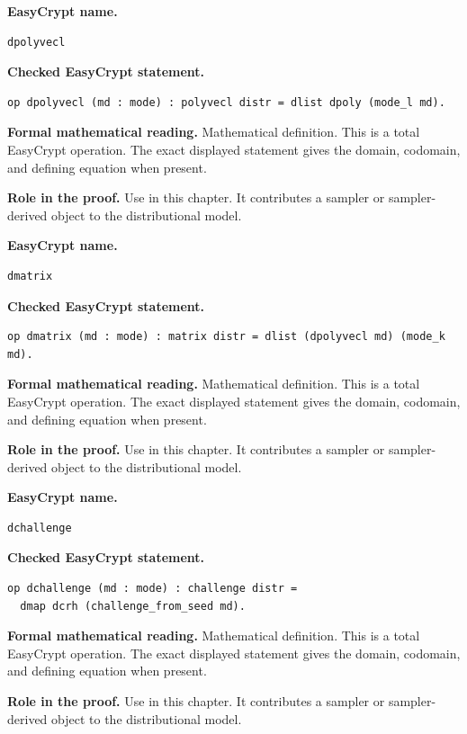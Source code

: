 \begin{formaldefinition}
\noindent\textbf{EasyCrypt name.}
\begin{lstlisting}[language=EasyCrypt,basicstyle=\ttfamily\scriptsize]
dpolyvecl
\end{lstlisting}
\noindent\textbf{Checked EasyCrypt statement.}
\begin{lstlisting}[language=EasyCrypt,basicstyle=\ttfamily\scriptsize]
op dpolyvecl (md : mode) : polyvecl distr = dlist dpoly (mode_l md).
\end{lstlisting}
\noindent\textbf{Formal mathematical reading.}
Mathematical definition. This is a total EasyCrypt operation.  The exact displayed statement gives the domain, codomain, and defining equation when present.

\noindent\textbf{Role in the proof.}
Use in this chapter. It contributes a sampler or sampler-derived object to the distributional model.

\end{formaldefinition}

\begin{formaldefinition}
\noindent\textbf{EasyCrypt name.}
\begin{lstlisting}[language=EasyCrypt,basicstyle=\ttfamily\scriptsize]
dmatrix
\end{lstlisting}
\noindent\textbf{Checked EasyCrypt statement.}
\begin{lstlisting}[language=EasyCrypt,basicstyle=\ttfamily\scriptsize]
op dmatrix (md : mode) : matrix distr = dlist (dpolyvecl md) (mode_k md).
\end{lstlisting}
\noindent\textbf{Formal mathematical reading.}
Mathematical definition. This is a total EasyCrypt operation.  The exact displayed statement gives the domain, codomain, and defining equation when present.

\noindent\textbf{Role in the proof.}
Use in this chapter. It contributes a sampler or sampler-derived object to the distributional model.

\end{formaldefinition}

\begin{formaldefinition}
\noindent\textbf{EasyCrypt name.}
\begin{lstlisting}[language=EasyCrypt,basicstyle=\ttfamily\scriptsize]
dchallenge
\end{lstlisting}
\noindent\textbf{Checked EasyCrypt statement.}
\begin{lstlisting}[language=EasyCrypt,basicstyle=\ttfamily\scriptsize]
op dchallenge (md : mode) : challenge distr =
  dmap dcrh (challenge_from_seed md).
\end{lstlisting}
\noindent\textbf{Formal mathematical reading.}
Mathematical definition. This is a total EasyCrypt operation.  The exact displayed statement gives the domain, codomain, and defining equation when present.

\noindent\textbf{Role in the proof.}
Use in this chapter. It contributes a sampler or sampler-derived object to the distributional model.

\end{formaldefinition}

